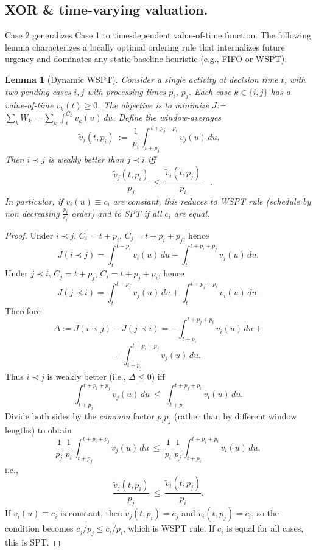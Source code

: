\documentclass[letterpaper]{article}
\newtheorem{lemma}{Lemma}
\newif\ifconf
\begin{document}

\subsection{XOR \& time-varying valuation.}
Case 2 generalizes Case 1 to time-dependent value-of-time function. 
The following lemma characterizes a locally optimal ordering rule that internalizes future urgency and dominates any static baseline heuristic (e.g., FIFO or WSPT).



\begin{lemma}[Dynamic WSPT]\label{lem:dyn-wspt}
Consider a single activity at decision time $t$, with two pending cases $i,j$ with processing times  $p_i$, $p_j$.
Each case $k\in\{i,j\}$ has a value-of-time $v_k(t)\ge0$.
The objective is to minimize $J$:= $\sum_{k} W_k= \sum_{k}\int_{t}^{C_k} v_k(u)\,du$. Define the window-averages
\[
\tilde v_j(t, p_i)\ :=\ \frac{1}{p_i}\!\int_{t+p_j}^{\,t+p_j+p_i}\! v_j(u)\,du,\qquad
\]
Then $i\prec j$ is weakly better than $j\prec i$ iff
\[
\quad \frac{\tilde v_j(t, p_i)}{p_j}\ \le\ \frac{\tilde v_i(t, p_j)}{p_i}\quad.
\]
In particular, if $v_i(u)\equiv c_i$ are constant, this reduces to WSPT rule (schedule by non decreasing $\frac{p_i}{c_i}$ order) and to SPT if all $c_i$ are equal.
\end{lemma} \ifconf
The formal proof is deferred to the technical appendix.
\else
   \begin{proof}
Under $i\prec j$, $C_i=t+p_i$, $C_j=t+p_i+p_j$, hence
\[
J(i\prec j)=\int_{t}^{t+p_i} v_i(u)\,du+\int_{t}^{t+p_i+p_j} v_j(u)\,du.
\]
Under $j\prec i$, $C_j=t+p_j$, $C_i=t+p_j+p_i$, hence
\[
J(j\prec i)=\int_{t}^{t+p_j} v_j(u)\,du+\int_{t}^{t+p_j+p_i} v_i(u)\,du.
\]
Therefore
\[
\Delta:=J(i\prec j)-J(j\prec i)
=-\!\int_{t+p_i}^{t+p_j+p_i}\! v_i(u)\,du +
\]
\[
+\!\int_{t+p_j}^{t+p_i+p_j}\! v_j(u)\,du .
\]
Thus $i\prec j$ is weakly better (i.e., $\Delta\le0$) iff
\[
\int_{t+p_j}^{t+p_i+p_j}\! v_j(u)\,du
\ \le\
\int_{t+p_i}^{t+p_j+p_i}\! v_i(u)\,du .
\]
Divide both sides by the \emph{common} factor $p_ip_j$ (rather than by different window lengths) to obtain
\[
\frac{1}{p_j}\,\frac{1}{p_i}\!\int_{t+p_j}^{t+p_i+p_j}\! v_j(u)\,du
\ \le\
\frac{1}{p_i}\,\frac{1}{p_j}\!\int_{t+p_i}^{t+p_j+p_i}\! v_i(u)\,du,
\]
i.e.,
\[
\frac{\tilde v_j(t, p_i)}{p_j}\ \le\ \frac{\tilde v_i(t, p_j)}{p_i}.
\]
If $v_i(u)\equiv c_i$ is constant, then $\tilde v_j(t,p_i)=c_j$ and $\tilde v_i(t,p_j)=c_i$, so the condition becomes
$c_j/p_j \le c_i/p_i$, which is WSPT rule. 
If $c_i$ is equal for all cases, this is SPT. 
\end{proof}
\fi
\end{document}
